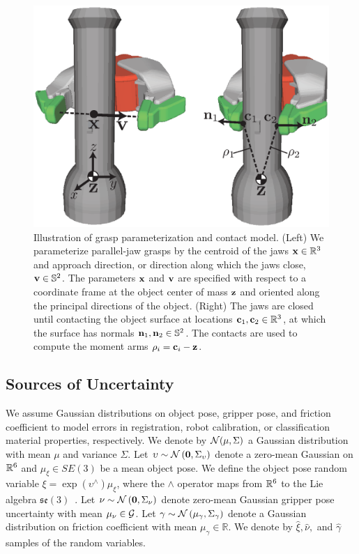 \begin{figure}[t!]
\centering
\includegraphics[scale=0.44]{figures/illustrations/dexnet_grasping_model.eps}
\caption{Illustration of grasp parameterization and contact model. (Left) We parameterize parallel-jaw grasps by the centroid of the jaws $\mathbf{x} \in \mathbb{R}^3$ and approach direction, or direction along which the jaws close, $\mathbf{v} \in \mathbb{S}^2$. The parameters $\mathbf{x}$ and $\mathbf{v}$ are specified with respect to a coordinate frame at the object center of mass $\mathbf{z}$ and oriented along the principal directions of the object. (Right) The jaws are closed until contacting the object surface at locations $\mathbf{c}_1, \mathbf{c}_2 \in \mathbb{R}^3$, at which the surface has normals $\mathbf{n}_1, \mathbf{n}_2 \in \mathbb{S}^2$. The contacts are used to compute the moment arms $\rho_i = \mathbf{c}_i - \mathbf{z}$.
}
\vspace*{-15pt}
\end{figure}

\subsection{Sources of Uncertainty}
We assume Gaussian distributions on object pose, gripper pose, and friction coefficient to model errors in registration, robot calibration, or classification material properties, respectively. 
We denote by $\mathcal{N}(\mu,\Sigma)$ a Gaussian distribution with mean $\mu$ and variance $\Sigma$.
Let $\upsilon \sim \mathcal{N}\left(\mathbf{0}, \Sigma_{\upsilon}\right)$ denote a zero-mean Gaussian on $\mathbb{R}^6$ and $\mu_{\xi} \in SE(3)$ be a mean object pose.
We define the object pose random variable $\xi = \exp\left( \upsilon^{\wedge} \right) \mu_{\xi}$, where the $\wedge$ operator maps from $\mathbb{R}^6$ to the Lie algebra $\mathfrak{se}(3)$~\cite{barfoot2014associating}.
Let $\nu \sim \mathcal{N}\left(\mathbf{0}, \Sigma_{\nu}\right)$ denote zero-mean Gaussian gripper pose uncertainty with mean $\mu_{\nu} \in \mathcal{G}$.
Let $\gamma \sim \mathcal{N}\left(\mu_{\gamma}, \Sigma_{\gamma} \right)$ denote a Gaussian distribution on friction coefficient with mean $\mu_{\gamma} \in \mathbb{R}$.
We denote by $\hat{\xi}, \hat{\nu},$ and $\hat{\gamma}$ samples of the random variables. 

